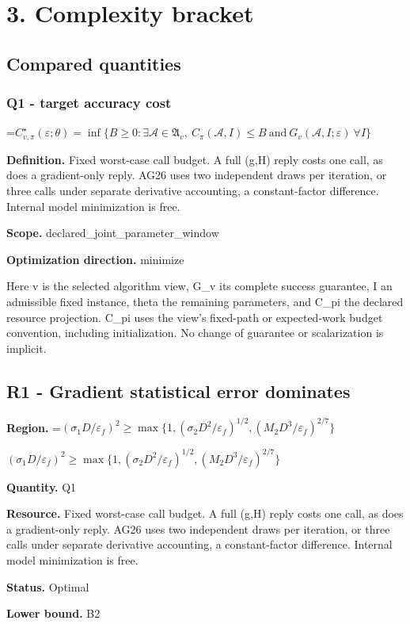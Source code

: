 \documentclass[10pt,a4paper]{article}
\newcommand{\AtlasMath}[1]{\par\begingroup\centering\setbox0=\hbox{$\displaystyle #1$}\ifdim\wd0>1.4\linewidth\typeout{ATLAS WIDE FORMULA: \the\wd0}\fi\ifdim\wd0>\linewidth\resizebox{\linewidth}{!}{\box0}\else\box0\fi\par\endgroup}
\newcommand{\AtlasInlineMath}[1]{\begingroup\setbox0=\hbox{$#1$}\ifdim\wd0>.4\linewidth\endgroup\AtlasMath{#1}\else\endgroup$#1$\fi}
\begin{document}
\section{3. Complexity bracket}
\subsection{Compared quantities}
\subsubsection{Q1 - target accuracy cost}
\AtlasMath{C^\star_{v,\pi}(\varepsilon;\theta)=\inf\{B\ge0:\exists\mathcal A\in\mathfrak A_v,\ C_\pi(\mathcal A,I)\le B\ \text{and}\ G_v(\mathcal A,I;\varepsilon)\ \forall I\}}
\textbf{Definition.} Fixed worst-case call budget. A full (g,H) reply costs one call, as does a gradient-only reply. AG26 uses two independent draws per iteration, or three calls under separate derivative accounting, a constant-factor difference. Internal model minimization is free.

\textbf{Scope.} declared\_joint\_parameter\_window

\textbf{Optimization direction.} minimize

Here v is the selected algorithm view, G\_v its complete success guarantee, I an admissible fixed instance, theta the remaining parameters, and C\_pi the declared resource projection. C\_pi uses the view's fixed-path or expected-work budget convention, including initialization. No change of guarantee or scalarization is implicit.

\subsection{R1 - Gradient statistical error dominates}
\textbf{Region.} \AtlasInlineMath{(\sigma_1D/\varepsilon_f)^2\ge\max\{1,(\sigma_2D^2/\varepsilon_f)^{1/2},(M_2D^3/\varepsilon_f)^{2/7}\}}

\textbf{Quantity.} Q1

\textbf{Resource.} Fixed worst-case call budget. A full (g,H) reply costs one call, as does a gradient-only reply. AG26 uses two independent draws per iteration, or three calls under separate derivative accounting, a constant-factor difference. Internal model minimization is free.

\textbf{Status.} Optimal

\textbf{Lower bound.} B2
\end{document}
